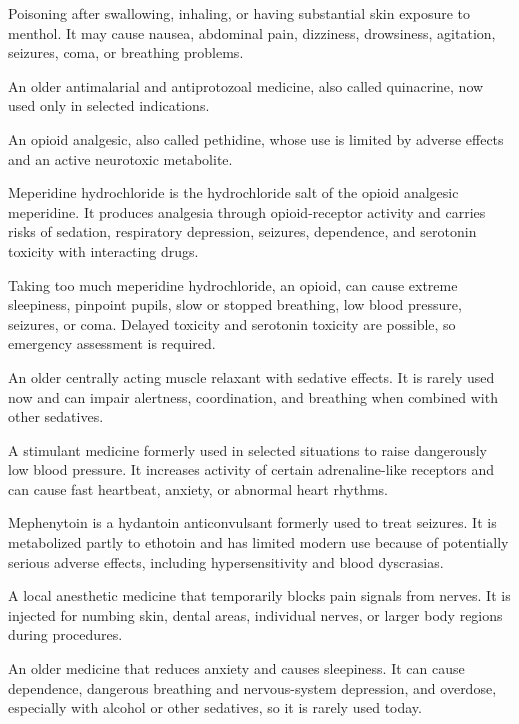  Poisoning after swallowing, inhaling, or having substantial skin exposure to menthol. It may cause nausea, abdominal pain, dizziness, drowsiness, agitation, seizures, coma, or breathing problems.

 An older antimalarial and antiprotozoal medicine, also called quinacrine, now used only in selected indications.

 An opioid analgesic, also called pethidine, whose use is limited by adverse effects and an active neurotoxic metabolite.

 Meperidine hydrochloride is the hydrochloride salt of the opioid analgesic meperidine. It produces analgesia through opioid-receptor activity and carries risks of sedation, respiratory depression, seizures, dependence, and serotonin toxicity with interacting drugs.

 Taking too much meperidine hydrochloride, an opioid, can cause extreme sleepiness, pinpoint pupils, slow or stopped breathing, low blood pressure, seizures, or coma. Delayed toxicity and serotonin toxicity are possible, so emergency assessment is required.

 An older centrally acting muscle relaxant with sedative effects. It is rarely used now and can impair alertness, coordination, and breathing when combined with other sedatives.

 A stimulant medicine formerly used in selected situations to raise dangerously low blood pressure. It increases activity of certain adrenaline-like receptors and can cause fast heartbeat, anxiety, or abnormal heart rhythms.

 Mephenytoin is a hydantoin anticonvulsant formerly used to treat seizures. It is metabolized partly to ethotoin and has limited modern use because of potentially serious adverse effects, including hypersensitivity and blood dyscrasias.

 A local anesthetic medicine that temporarily blocks pain signals from nerves. It is injected for numbing skin, dental areas, individual nerves, or larger body regions during procedures.

 An older medicine that reduces anxiety and causes sleepiness. It can cause dependence, dangerous breathing and nervous-system depression, and overdose, especially with alcohol or other sedatives, so it is rarely used today.


